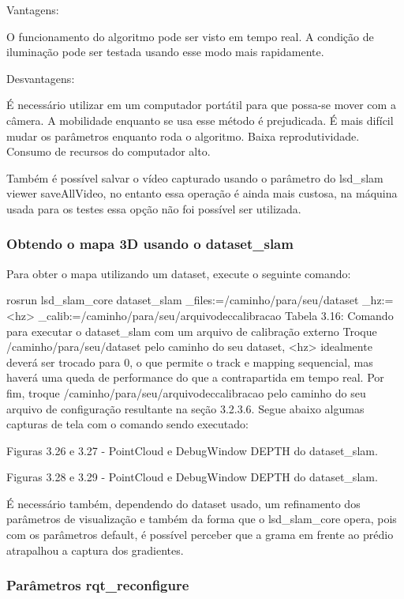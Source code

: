 Vantagens:

O funcionamento do algoritmo pode ser visto em tempo real.
A condição de iluminação pode ser testada usando esse modo mais rapidamente.

Desvantagens:

É necessário utilizar em um computador portátil para que possa-se mover com a câmera.
A mobilidade enquanto se usa esse método é prejudicada.
É mais difícil mudar os parâmetros enquanto roda o algoritmo.
Baixa reprodutividade.
Consumo de recursos do computador alto.

Também é possível salvar o vídeo capturado usando o parâmetro do lsd\_slam viewer saveAllVideo, no entanto essa operação é ainda mais custosa, na máquina usada para os testes essa opção não foi possível ser utilizada.

\subsubsection{Obtendo o mapa 3D usando o dataset\_slam}

Para obter o mapa utilizando um dataset, execute o seguinte comando:

rosrun lsd\_slam\_core dataset\_slam \_files:=/caminho/para/seu/dataset \_hz:=<hz> \_calib:=/caminho/para/seu/arquivodeccalibracao
Tabela 3.16: Comando para executar o dataset\_slam com um arquivo de calibração externo
Troque /caminho/para/seu/dataset pelo caminho do seu dataset, <hz> idealmente deverá ser trocado para 0, o que permite o track e mapping sequencial, mas haverá uma queda de performance do que a contrapartida em tempo real. Por fim, troque /caminho/para/seu/arquivodeccalibracao pelo caminho do seu arquivo de configuração resultante na seção 3.2.3.6.
Segue abaixo algumas capturas de tela com o comando sendo executado:

Figuras 3.26 e 3.27 - PointCloud e DebugWindow DEPTH do dataset\_slam.

	Figuras 3.28 e 3.29 - PointCloud e DebugWindow DEPTH do dataset\_slam.

É necessário também, dependendo do dataset usado, um refinamento dos parâmetros de visualização e também da forma que o lsd\_slam\_core opera, pois com os parâmetros default, é possível perceber que a grama em frente ao prédio atrapalhou a captura dos gradientes.

\subsubsection{Parâmetros rqt\_reconfigure}

